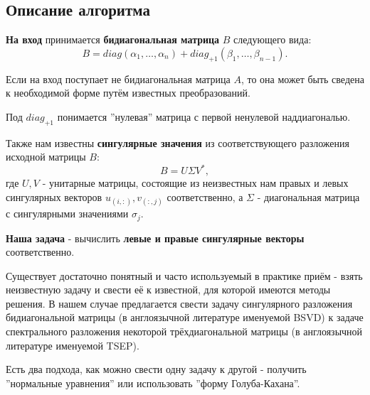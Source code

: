 

\subsection{Описание алгоритма}
\textbf{На вход} принимается \textbf{бидиагональная матрица} \(B\) следующего вида:
\[
        B= diag(\alpha_1,\dots,\alpha_n)+diag_{+1}(\beta_1,\dots,\beta_{n-1}).
\]

\begin{note}
    Если на вход поступает не бидиагональная матрица \(A\), то она может быть сведена к необходимой форме путём известных преобразований.
\end{note}

\begin{note}
    Под \(diag_{+1}\) понимается ''нулевая'' матрица с первой ненулевой наддиагональю.
\end{note}

Также нам известны \textbf{сингулярные значения} из соответствующего разложения исходной матрицы \(B\):
\begin{equation}
        B=U \Sigma V^*,
\end{equation}
где $U,V$ - унитарные матрицы, состоящие из неизвестных нам правых и левых сингулярных векторов $u_{(i,:)},v_{(:,j)}$ соответственно, а $\Sigma$ - диагональная матрица с сингулярными значениями \(\sigma_j\).

\textbf{Наша задача} - вычислить \textbf{левые и правые сингулярные векторы} соответственно.

Существует достаточно понятный и часто используемый в практике приём - взять неизвестную задачу и свести её к известной, для которой имеются методы решения. В нашем случае предлагается свести задачу сингулярного разложения бидиагональной матрицы (в англоязычной литературе именуемой BSVD) к задаче спектрального разложения некоторой трёхдиагональной матрицы (в англоязычной литературе именуемой TSEP).

Есть два подхода, как можно свести одну задачу к другой - получить ''нормальные уравнения'' или использовать ''форму Голуба-Кахана''.

